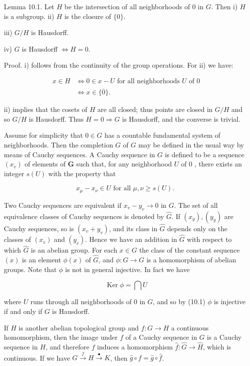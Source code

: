 \documentclass{standalone}
\theoremstyle{definition}
\theoremstyle{remark}
\begin{document}
Lemma 10.1. Let $H$ be the intersection of all neighborhoods of 0 in $G$. Then i) $H$ is a subgroup. ii) $H$ is the closure of $\{0\}$.

iii) $G / H$ is Hausdorff.

iv) $G$ is Hausdorff $\Leftrightarrow H=0$.

Proof. i) follows from the continuity of the group operations. For ii) we have:

\[
\begin{aligned}
x \in H & \Leftrightarrow 0 \in x-U \text { for all neighborhoods } U \text { of } 0 \\
& \Leftrightarrow x \in \overline{\{0\}} .
\end{aligned}
\]

ii) implies that the cosets of $H$ are all closed; thus points are closed in $G / H$ and so $G / H$ is Hausdorff. Thus $H=0 \Rightarrow G$ is Hausdorff, and the converse is trivial.

Assume for simplicity that $0 \in G$ has a countable fundamental system of neighborhoods. Then the completion $G$ of $G$ may be defined in the usual way by means of Cauchy sequences. A Cauchy sequence in $G$ is defined to be a sequence $\left(x_{v}\right)$ of elements of $\boldsymbol{G}$ such that, for any neighborhood $U$ of 0 , there exists an integer $s(U)$ with the property that

\[
x_{\mu}-x_{\nu} \in U \text { for all } \mu, \nu \geqslant s(U) \text {. }
\]

Two Cauchy sequences are equivalent if $x_{v}-y_{v} \rightarrow 0$ in $G$. The set of all equivalence classes of Cauchy sequences is denoted by $\hat{G}$. If $\left(x_{y}\right),\left(y_{y}\right)$ are Cauchy sequences, so is $\left(x_{v}+y_{v}\right)$, and its class in $\hat{G}$ depends only on the classes of $\left(x_{v}\right)$ and $\left(y_{v}\right)$. Hence we have an addition in $\hat{G}$ with respect to which $\hat{G}$ is an abelian group. For each $x \in G$ the class of the constant sequence $(x)$ is an element $\phi(x)$ of $\hat{G}$, and $\phi: G \rightarrow G$ is a homomorphism of abelian groups. Note that $\phi$ is not in general injective. In fact we have

\[
\operatorname{Ker} \phi=\bigcap U
\]

where $U$ runs through all neighborhoods of 0 in $G$, and so by (10.1) $\phi$ is injective if and only if $G$ is Hausdorff.

If $H$ is another abelian topological group and $f: G \rightarrow H$ a continuous homomorphism, then the image under $f$ of a Cauchy sequence in $G$ is a Cauchy sequence in $H$, and therefore $f$ induces a homomorphism $\hat{f}: \hat{G} \rightarrow \hat{H}$, which is continuous. If we have $G \stackrel{f}{\rightarrow} H \stackrel{\bullet}{\rightarrow} K$, then $\widehat{g} \circ f=\hat{g} \circ \hat{f}$.
\end{document}
